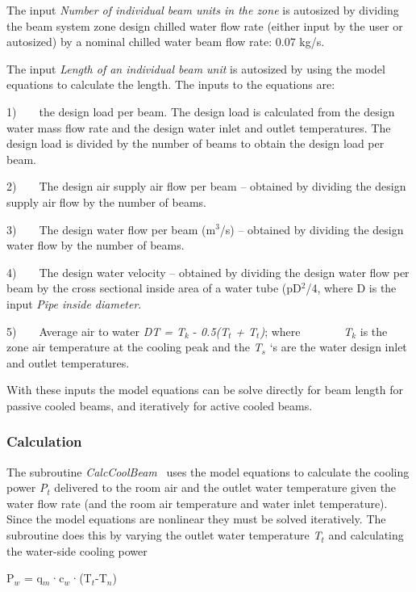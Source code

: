 The input \emph{Number of individual beam units in the zone} is autosized by dividing the beam system zone design chilled water flow rate (either input by the user or autosized) by a nominal chilled water beam flow rate: 0.07 kg/s.

The input \emph{Length of an individual beam unit} is autosized by using the model equations to calculate the length. The inputs to the equations are:

1)~~~~the design load per beam. The design load is calculated from the design water mass flow rate and the design water inlet and outlet temperatures. The design load is divided by the number of beams to obtain the design load per beam.

2)~~~~The design air supply air flow per beam -- obtained by dividing the design supply air flow by the number of beams.

3)~~~~The design water flow per beam (m\(^{3}\)/s) -- obtained by dividing the design water flow by the number of beams.

4)~~~~The design water velocity -- obtained by dividing the design water flow per beam by the cross sectional inside area of a water tube (pD\(^{2}\)/4, where D is the input \emph{Pipe inside diameter}.

5)~~~~Average air to water \emph{DT = T\(_{k}\)} - \emph{0.5(T\(_{t}\)} \emph{+ T\(_{t}\))}; where~~~~~~~ \emph{T\(_{k}\)} is the zone air temperature at the cooling peak and the \emph{T\(_{s}\)} `s are the water design inlet and outlet temperatures.

With these inputs the model equations can be solve directly for beam length for passive cooled beams, and iteratively for active cooled beams.

\subsubsection{Calculation}\label{calculation-3}

The subroutine \emph{CalcCoolBeam} ~uses the model equations to calculate the cooling power \emph{P\(_{t}\)} delivered to the room air and the outlet water temperature given the water flow rate (and the room air temperature and water inlet temperature). Since the model equations are nonlinear they must be solved iteratively. The subroutine does this by varying the outlet water temperature \emph{T\(_{t}\)} and calculating the water-side cooling power

P\(_{w}\) = q\(_{m}\)·c\(_{w}\)·(T\(_{t}\)-T\(_{n}\))

